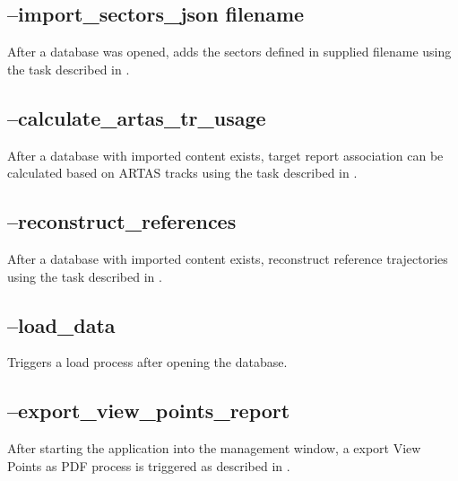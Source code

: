 % 
% 


\subsection{--import\_sectors\_json  filename}

After a database was opened, adds the sectors defined in supplied filename using the task described in .

\subsection{--calculate\_artas\_tr\_usage}

After a database with imported content exists, target report association can be calculated based on ARTAS tracks using the task described in .

\subsection{--reconstruct\_references}

After a database with imported content exists, reconstruct reference trajectories using the task described in .

\subsection{--load\_data}

Triggers a load process after opening the database.

\subsection{--export\_view\_points\_report}

After starting the application into the management window, a export View Points as PDF process is triggered as described in
.

